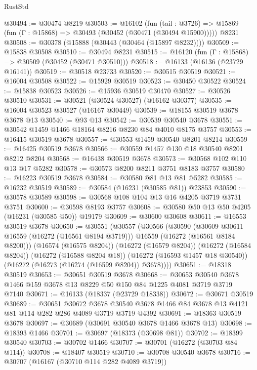 \begin{lexlean}{RustStd}
\begin{coremodule}
@30494 := @30474 @8219
@30503 := @16102
    (fun (tail : @3726) => @15869 (fun (Γ : @15868) => @30493 (@30452 (@30471 (@30494 @15900)))))
    @8231
@30508 := @30378 (@15888 (@30443 (@30464 (@15897 @8232))))
@30509 := @15838 @30508
@30510 := @30494 @8231
@30515 := @16120 (fun (Γ : @15868) => @30509 (@30452 (@30471 @30510)))
@30518 := @16133 (@16136 (@23729 @16141))
@30519 := @30518 @23733
@30520 := @30515 @30519
@30521 := @16004 @30508
@30522 := @15929 @30519
@30523 := @30450 @30522
@30524 := @15838 @30523
@30526 := @15936 @30519 @30470
@30527 := @30526 @30510
@30531 := @30521 (@30524 @30527) (@16162 @30377)
@30535 := @16004 @30523 @30527 (@16167 @30449)
@30539 := @18155 @30519 @3678 @3678 @13
@30540 := @93 @13
@30542 := @30539 @30540 @3678
@30551 := @30542 @1459 @1466 @18164 @8216 @8230 @84 @4010 @8175 @3757
@30553 := @16415 @30519 @3678
@30557 := @30553 @1459 @30540 @8201 @8214
@30559 := @16425 @30519 @3678
@30566 := @30559 @1457 @130 @18 @30540 @8201 @8212 @8204
@30568 := @16438 @30519 @3678
@30573 := @30568 @102 @110 @13 @17 @5282
@30578 := @30573 @8200 @8211 @3751 @8183 @3757
@30580 := @16223 @30519 @3678
@30584 := @30580 @81 @13 @81 @5282
@30585 := @16232 @30519
@30589 := @30584 (@16231 (@30585 @81)) @23853
@30590 := @30578 @30589
@30598 := @30568 @108 @104 @13 @16 @4205 @3719 @3731 @3751
@30600 := @30598 @8193 @3757
@30608 := @30580 @50 @13 @50 @4205 (@16231 (@30585 @50)) @19179
@30609 := @30600 @30608
@30611 := @16553 @30519 @3678
@30650 := @30551
    (@30557
      (@30566
        (@30590
          (@30609 @30611 @16559 (@16272 (@16561 @8194 @3719)))
          @16559
          (@16272 (@16561 @8184 @8200)))
        (@16574 (@16575 @8204))
        (@16272 (@16579 @8204))
        (@16272 (@16584 @8204))
        (@16272 (@16588 @8204 @18))
        (@16272 (@16593 @1457 @18 @30540))
        (@16272 (@16273 (@16274 (@16599 @8204)) @3678))))
@30651 := @18318 @30519
@30653 := @30651 @30519 @3678
@30668 := @30653 @30540 @3678 @1466 @159 @3678 @13 @8229 @50 @150 @84 @1225 @4081 @3719 @3719 @7140
@30671 := @16133 (@18337 (@23729 @18338))
@30672 := @30671 @30519
@30689 := @30651
    @30672
    @3678
    @30540
    @3678
    @1466
    @84
    @3678
    @13
    @4121
    @81
    @114
    @282
    @286
    @4089
    @3719
    @3719
    @4392
@30691 := @18363 @30519 @3678
@30697 := @30689 (@30691 @30540 @3678 @1466 @3678 @13)
@30698 := @18393 @1466
@30701 := @30697 (@18373 (@30698 @81))
@30702 := @18399 @30540
@30703 := @30702 @1466
@30707 := @30701 (@16272 (@30703 @84 @114))
@30708 := @18407 @30519
@30710 := @30708 @30540 @3678
@30716 := @30707 (@16167 (@30710 @114 @282 @4089 @3719))

\end{coremodule}
\end{lexlean}
